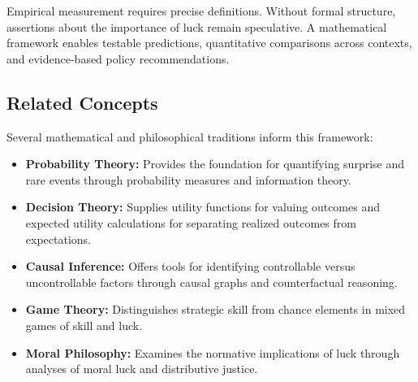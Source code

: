 Empirical measurement requires precise definitions. Without formal
structure, assertions about the importance of luck remain speculative. A
mathematical framework enables testable predictions, quantitative comparisons
across contexts, and evidence-based policy recommendations.

\subsection{Related Concepts}

Several mathematical and philosophical traditions inform this framework:

\begin{itemize}
  \item \textbf{Probability Theory:} Provides the foundation for
    quantifying surprise and rare events through probability measures
    and information theory.

  \item \textbf{Decision Theory:} Supplies utility functions for valuing
    outcomes and expected utility calculations for separating realized
    outcomes from expectations.

  \item \textbf{Causal Inference:} Offers tools for identifying
    controllable versus uncontrollable factors through causal graphs and
    counterfactual reasoning.

  \item \textbf{Game Theory:} Distinguishes strategic skill from chance
    elements in mixed games of skill and luck.

  \item \textbf{Moral Philosophy:} Examines the normative implications
    of luck through analyses of moral luck and distributive justice.
\end{itemize}
